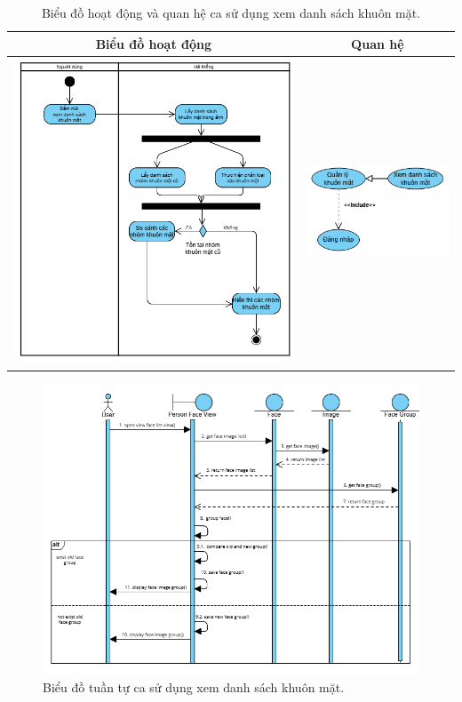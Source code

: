 \vspace{0.8cm}

\noindent 
\begin{table}[H]
\centering
\begin{tabular}{| c | c |}
    \hline
    \textbf{Biểu đồ hoạt động} & \textbf{Quan hệ} \\ 
    \hline
    \includegraphics[width=0.6\linewidth]{figures/c3/3-3-10-activity-diagram.png} 
    &  
    \includegraphics[width=0.35\linewidth]{figures/c3/3-3-10-relationship.png} \\ 
    \hline
\end{tabular}
\caption{Biểu đồ hoạt động và quan hệ ca sử dụng xem danh sách khuôn mặt.}
\label{tab:view-face-usecase-activity}
\end{table}

\begin{figure}[H]
    \centering  
    \includegraphics[width=1.1\textwidth]{figures/c3/3-3-10-sequence-diagram.png}
    \caption{Biểu đồ tuần tự ca sử dụng xem danh sách khuôn mặt.}
    \label{fig:3-3-10-sequence-diagram}
\end{figure}